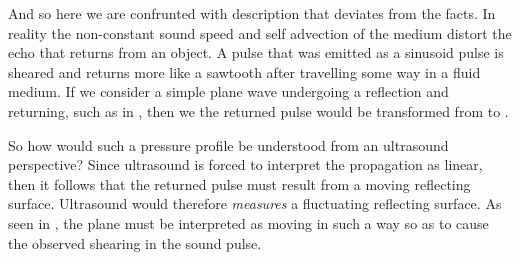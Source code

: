 
And so here we are confrunted with description that deviates from the facts.
In reality the non-constant sound speed and self advection of the medium distort the echo that returns from an object.
%
A pulse that was emitted as a sinusoid pulse is sheared and returns more like a sawtooth after travelling some way in a fluid medium.
If we consider a simple plane wave undergoing a reflection and returning, such as in  ,
then we the returned pulse would be transformed from  to .

So how would such a pressure profile be understood from an ultrasound perspective?
Since ultrasound is forced to interpret the propagation as linear,
then it follows that the returned pulse must result from a moving reflecting surface.
Ultrasound would therefore  {\em measures} a fluctuating reflecting surface.
As seen in , 
the plane must be interpreted as moving in such a way so as to cause the observed shearing in the sound pulse.

